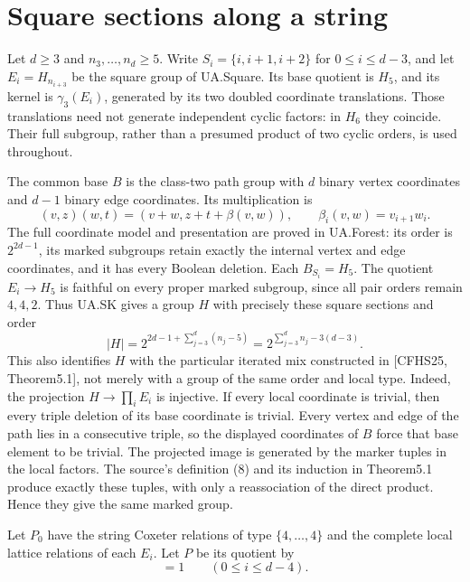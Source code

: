 \documentclass[11pt,a4paper]{article}
\theoremstyle{remark}\newtheorem{remark}[theorem]{Remark}
\begin{document}
\section{Square sections along a string}
Let $d\geq3$ and $n_3,\ldots,n_d\geq5$. Write
$S_i=\{i,i+1,i+2\}$ for $0\leq i\leq d-3$, and let $E_i=H_{n_{i+3}}$
be the square group of UA.Square. Its base quotient is $H_5$, and its kernel
is $\gamma_3(E_i)$, generated by its two doubled coordinate translations.
Those translations need not generate independent cyclic factors: in $H_6$
they coincide. Their full subgroup, rather than a presumed product of two
cyclic orders, is used throughout.

The common base $B$ is the class-two path group with $d$ binary vertex
coordinates and $d-1$ binary edge coordinates. Its multiplication is
\[
 (v,z)(w,t)=(v+w,z+t+\beta(v,w)),\qquad
 \beta_i(v,w)=v_{i+1}w_i.
\]
The full coordinate model and presentation are proved in UA.Forest: its order
is $2^{2d-1}$, its marked subgroups retain exactly the internal vertex and
edge coordinates, and it has every Boolean deletion. Each $B_{S_i}=H_5$.
The quotient $E_i\to H_5$ is faithful on every proper marked subgroup, since
all pair orders remain $4,4,2$. Thus UA.SK gives a group $H$ with precisely
these square sections and order
\begin{equation}
 |H|=2^{2d-1+\sum_{j=3}^d(n_j-5)}
     =2^{\sum_{j=3}^d n_j-3(d-3)}.                            \label{eq:pathorder}
\end{equation}
This also identifies $H$ with the particular iterated mix constructed in
[CFHS25, Theorem5.1], not merely with a group of the same order and local
type. Indeed, the projection $H\to\prod_i E_i$ is injective. If every local
coordinate is trivial, then every triple deletion of its base coordinate is
trivial. Every vertex and edge of the path lies in a consecutive triple, so
the displayed coordinates of $B$ force that base element to be trivial.
The projected image is generated by the marker tuples in the local factors.
The source's definition (8) and its induction in Theorem5.1 produce exactly
these tuples, with only a reassociation of the direct product. Hence they
give the same marked group.

Let $P_0$ have the string Coxeter relations of type $\{4,\ldots,4\}$ and
the complete local lattice relations of each $E_i$. Let $P$ be its quotient
by
\begin{equation}
 [(r_i r_{i+1})^2,(r_{i+2}r_{i+3})^2]=1
       \qquad(0\leq i\leq d-4).                             \label{eq:four}
\end{equation}
\end{document}
